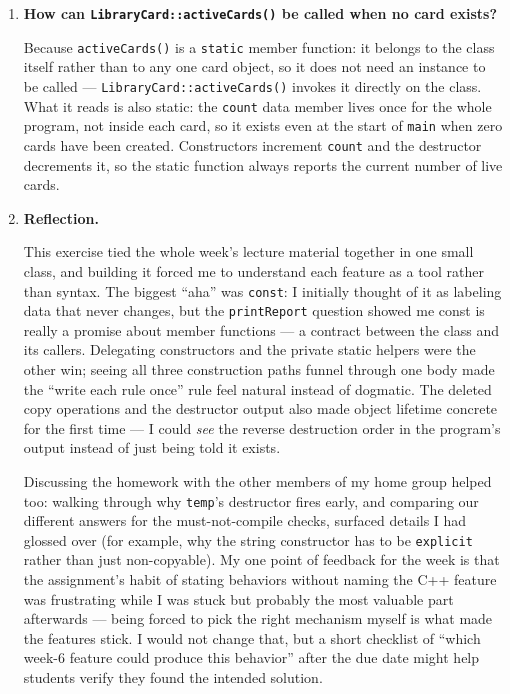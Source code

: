 \documentclass[11pt]{article}
\begin{document}
\begin{enumerate}[leftmargin=2em, itemsep=1em]
\item \textbf{How can \texttt{LibraryCard::activeCards()} be called when no
card exists?}

Because \texttt{activeCards()} is a \texttt{static} member function: it
belongs to the class itself rather than to any one card object, so it does not
need an instance to be called --- \texttt{LibraryCard::activeCards()} invokes
it directly on the class. What it reads is also static: the \texttt{count}
data member lives once for the whole program, not inside each card, so it
exists even at the start of \texttt{main} when zero cards have been created.
Constructors increment \texttt{count} and the destructor decrements it, so the
static function always reports the current number of live cards.

\item \textbf{Reflection.}

This exercise tied the whole week's lecture material together in one small
class, and building it forced me to understand each feature as a tool rather
than syntax. The biggest ``aha'' was \texttt{const}: I initially thought of it
as labeling data that never changes, but the \texttt{printReport} question
showed me const is really a promise about member functions --- a contract
between the class and its callers. Delegating constructors and the private
static helpers were the other win; seeing all three construction paths funnel
through one body made the ``write each rule once'' rule feel natural instead
of dogmatic. The deleted copy operations and the destructor output also made
object lifetime concrete for the first time --- I could \emph{see} the reverse
destruction order in the program's output instead of just being told it
exists.

Discussing the homework with the other members of my home group helped too:
walking through why \texttt{temp}'s destructor fires early, and comparing our
different answers for the must-not-compile checks, surfaced details I had
glossed over (for example, why the string constructor has to be
\texttt{explicit} rather than just non-copyable). My one point of feedback for
the week is that the assignment's habit of stating behaviors without naming
the C++ feature was frustrating while I was stuck but probably the most
valuable part afterwards --- being forced to pick the right mechanism myself
is what made the features stick. I would not change that, but a short
checklist of ``which week-6 feature could produce this behavior'' after the
due date might help students verify they found the intended solution.

\end{enumerate}
\end{document}
